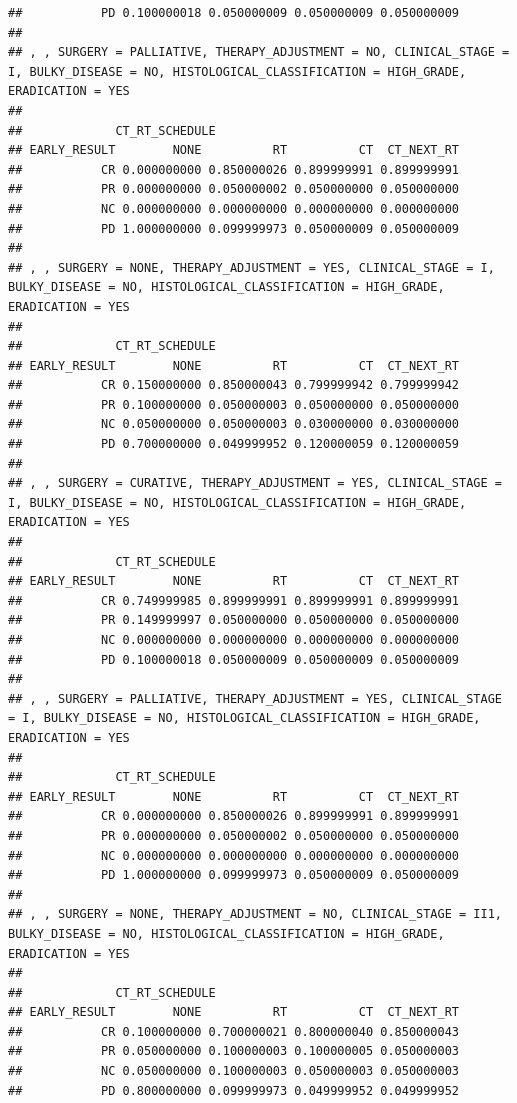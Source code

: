 \documentclass[]{article}
\begin{document}
\begin{verbatim}
##           PD 0.100000018 0.050000009 0.050000009 0.050000009
## 
## , , SURGERY = PALLIATIVE, THERAPY_ADJUSTMENT = NO, CLINICAL_STAGE = I, BULKY_DISEASE = NO, HISTOLOGICAL_CLASSIFICATION = HIGH_GRADE, ERADICATION = YES
## 
##             CT_RT_SCHEDULE
## EARLY_RESULT        NONE          RT          CT  CT_NEXT_RT
##           CR 0.000000000 0.850000026 0.899999991 0.899999991
##           PR 0.000000000 0.050000002 0.050000000 0.050000000
##           NC 0.000000000 0.000000000 0.000000000 0.000000000
##           PD 1.000000000 0.099999973 0.050000009 0.050000009
## 
## , , SURGERY = NONE, THERAPY_ADJUSTMENT = YES, CLINICAL_STAGE = I, BULKY_DISEASE = NO, HISTOLOGICAL_CLASSIFICATION = HIGH_GRADE, ERADICATION = YES
## 
##             CT_RT_SCHEDULE
## EARLY_RESULT        NONE          RT          CT  CT_NEXT_RT
##           CR 0.150000000 0.850000043 0.799999942 0.799999942
##           PR 0.100000000 0.050000003 0.050000000 0.050000000
##           NC 0.050000000 0.050000003 0.030000000 0.030000000
##           PD 0.700000000 0.049999952 0.120000059 0.120000059
## 
## , , SURGERY = CURATIVE, THERAPY_ADJUSTMENT = YES, CLINICAL_STAGE = I, BULKY_DISEASE = NO, HISTOLOGICAL_CLASSIFICATION = HIGH_GRADE, ERADICATION = YES
## 
##             CT_RT_SCHEDULE
## EARLY_RESULT        NONE          RT          CT  CT_NEXT_RT
##           CR 0.749999985 0.899999991 0.899999991 0.899999991
##           PR 0.149999997 0.050000000 0.050000000 0.050000000
##           NC 0.000000000 0.000000000 0.000000000 0.000000000
##           PD 0.100000018 0.050000009 0.050000009 0.050000009
## 
## , , SURGERY = PALLIATIVE, THERAPY_ADJUSTMENT = YES, CLINICAL_STAGE = I, BULKY_DISEASE = NO, HISTOLOGICAL_CLASSIFICATION = HIGH_GRADE, ERADICATION = YES
## 
##             CT_RT_SCHEDULE
## EARLY_RESULT        NONE          RT          CT  CT_NEXT_RT
##           CR 0.000000000 0.850000026 0.899999991 0.899999991
##           PR 0.000000000 0.050000002 0.050000000 0.050000000
##           NC 0.000000000 0.000000000 0.000000000 0.000000000
##           PD 1.000000000 0.099999973 0.050000009 0.050000009
## 
## , , SURGERY = NONE, THERAPY_ADJUSTMENT = NO, CLINICAL_STAGE = II1, BULKY_DISEASE = NO, HISTOLOGICAL_CLASSIFICATION = HIGH_GRADE, ERADICATION = YES
## 
##             CT_RT_SCHEDULE
## EARLY_RESULT        NONE          RT          CT  CT_NEXT_RT
##           CR 0.100000000 0.700000021 0.800000040 0.850000043
##           PR 0.050000000 0.100000003 0.100000005 0.050000003
##           NC 0.050000000 0.100000003 0.050000003 0.050000003
##           PD 0.800000000 0.099999973 0.049999952 0.049999952

\end{verbatim}
\end{document}
